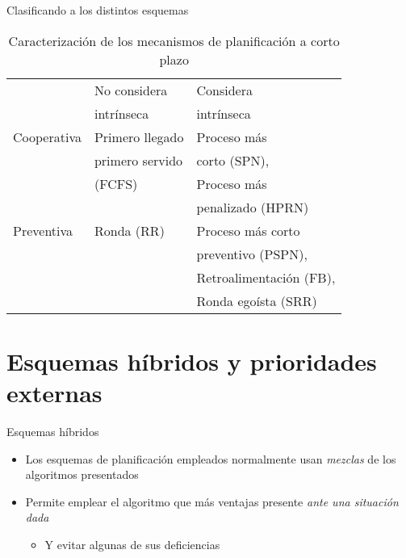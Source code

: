 \documentclass[presentation]{beamer}
\begin{document}
\begin{frame}[label={sec:org8bde01f}]{Clasificando a los distintos esquemas}
\begin{table}[htbp]
\caption{Caracterización de los mecanismos de planificación a corto plazo}
\centering
\begin{tabular}{lll}
\hline
 & \alert{No considera} & \alert{Considera}\\
 & \alert{intrínseca} & \alert{intrínseca}\\
\hline
\alert{Cooperativa} & Primero llegado & Proceso más\\
 & primero servido & corto (SPN),\\
 & (FCFS) & Proceso más\\
 &  & penalizado (HPRN)\\
\hline
\alert{Preventiva} & Ronda (RR) & Proceso más corto\\
 &  & preventivo (PSPN),\\
 &  & Retroalimentación (FB),\\
 &  & Ronda egoísta (SRR)\\
\hline
\end{tabular}
\end{table}
\end{frame}


\section{Esquemas híbridos y prioridades externas}
\label{sec:orgc5d6144}
\begin{frame}[label={sec:orgcc60c86}]{Esquemas híbridos}
\begin{itemize}
\item Los esquemas de planificación empleados normalmente usan \emph{mezclas}
de los algoritmos presentados
\item Permite emplear el algoritmo que más ventajas presente \emph{ante una
situación dada}
\begin{itemize}
\item Y evitar algunas de sus deficiencias
\end{itemize}
\end{itemize}
\end{frame}
\end{document}
